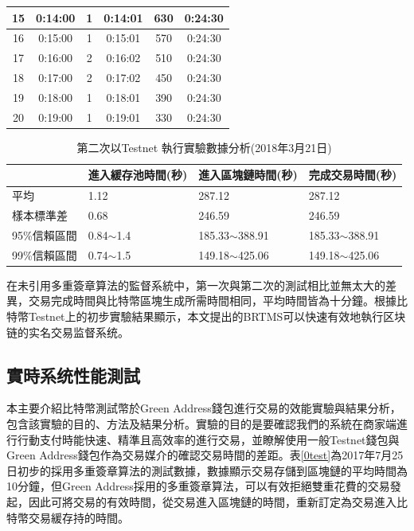\begin{enumerate}
\begin{table}[htbp]
\begin{tabular}{|c|c|c|c|c|c|}
				15 & 0:14:00 & 1 & 0:14:01 & 630 & 0:24:30 \\ \hline
				16 & 0:15:00 & 1 & 0:15:01 & 570 & 0:24:30 \\ \hline
				17 & 0:16:00 & 2 & 0:16:02 & 510 & 0:24:30 \\ \hline
				18 & 0:17:00 & 2 & 0:17:02 & 450 & 0:24:30 \\ \hline
				19 & 0:18:00 & 1 & 0:18:01 & 390 & 0:24:30 \\ \hline
				20 & 0:19:00 & 1 & 0:19:01 & 330 & 0:24:30 \\ \hline
				\end{tabular}
				\end{table}

				\begin{table}[htbp]
				\centering
				\caption{第二次以Testnet 執行實驗數據分析(2018年3月21日)}
				\label{2general-1}
				\begin{tabular}{|l|l|l|l|}
				\hline
				 & 進入緩存池時間(秒) & 進入區塊鏈時間(秒) & 完成交易時間(秒) \\ \hline
				平均 & 1.12 & 287.12 & 287.12 \\ \hline
				樣本標準差 & 0.68 & 246.59 & 246.59 \\ \hline
				95\%信賴區間 & 0.84$\sim$1.4 & 185.33$\sim$388.91 & 185.33$\sim$388.91 \\ \hline
				99\%信賴區間 & 0.74$\sim$1.5 & 149.18$\sim$425.06 & 149.18$\sim$425.06 \\ \hline
				\end{tabular}
				\end{table}


		\end{enumerate}

			在未引用多重簽章算法的監督系統中，第一次與第二次的測試相比並無太大的差異，交易完成時間與比特幣區塊生成所需時間相同，平均時間皆為十分鐘。根據比特幣Testnet上的初步實驗結果顯示，本文提出的BRTMS可以快速有效地執行区块链的实名交易监督系统。


		\subsection{實時系统性能測試}
		本主要介紹比特幣測試幣於Green Address錢包進行交易的效能實驗與結果分析，包含該實驗的目的、方法及結果分析。實驗的目的是要確認我們的系統在商家端進行行動支付時能快速、精準且高效率的進行交易，並瞭解使用一般Testnet錢包與Green Address錢包作為交易媒介的確認交易時間的差距。表\ref{0test}為2017年7月25日初步的採用多重簽章算法的測試數據，數據顯示交易存儲到區塊鏈的平均時間為10分鐘，但Green Address採用的多重簽章算法，可以有效拒絕雙重花費的交易發起，因此可將交易的有效時間，從交易進入區塊鏈的時間，重新訂定為交易進入比特幣交易緩存持的時間。

